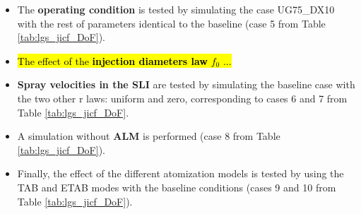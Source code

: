 \begin{itemize}
	\item The \textbf{operating condition} is tested by simulating the case UG75\_DX10 with the rest of parameters identical to the baseline (case 5 from Table \ref{tab:lgs_jicf_DoF}).
	
	\item \hl{The effect of the \textbf{injection diameters law} $f_0$ ...}
	
	\item \textbf{Spray velocities in the SLI} are tested by simulating the baseline case with the two other $\text{r}$ laws: uniform and zero, corresponding to cases 6 and 7 from Table \ref{tab:lgs_jicf_DoF}.
	
	\item A simulation without \textbf{ALM} is performed (case 8 from Table \ref{tab:lgs_jicf_DoF}).
	
	\item Finally, the effect of the different atomization models is tested by using the TAB and ETAB modes with the baseline conditions (cases 9 and 10 from Table \ref{tab:lgs_jicf_DoF}).	
	
\end{itemize}

\clearpage
	

